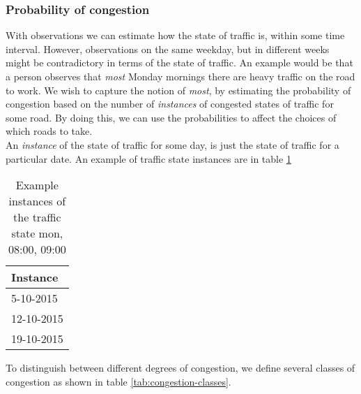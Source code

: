 \subsubsection{Probability of congestion}
With observations we can estimate how the state of traffic is, within some time interval. However, observations on the same weekday, but in different weeks might be contradictory in terms of the state of traffic. An example would be that a person observes that \emph{most} Monday mornings there are heavy traffic on the road to work. We wish to capture the notion of \emph{most}, by estimating the probability of congestion based on the number of \emph{instances} of congested states of traffic for some road. By doing this, we can use the probabilities to affect the choices of which roads to take.\\
An \emph{instance} of the state of traffic for some day, is just the state of traffic for a particular date. An example of traffic state instances are in table \ref{tab: traffic-state-instances}


\begin{table}[h]
\centering
\caption{Example instances of the traffic state mon, 08:00, 09:00}
\label{tab: traffic-state-instances}
\begin{tabular}{l}
\textbf{Instance} \\ \hline
5-10-2015         \\
12-10-2015        \\
19-10-2015       
\end{tabular}
\end{table}



To distinguish between different degrees of congestion, 
we define several classes of congestion as shown in table \ref{tab:congestion-classes}. 

